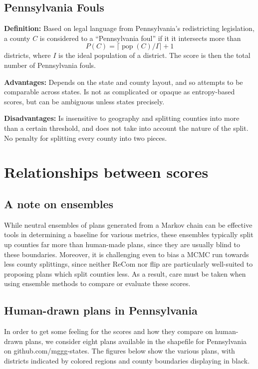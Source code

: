 \documentclass{mgggarticle}
\DeclareMathOperator{\pop}{pop}
\begin{document}
\subsection{Pennsylvania Fouls}
\textbf{Definition: } Based on legal language from Pennsylvania's redistricting legislation, a county $C$ is considered to a ``Pennsylvania foul'' if it it intersects more than 
$$
P(C) = \lceil \pop(C)/I \rceil+1 
$$
districts, where $I$ is the ideal population of a district. The score is then the total number of Pennsylvania fouls.

\textbf{Advantages: } Depends on the state and county layout, and so attempts to be comparable across states. Is not as complicated or opaque as entropy-based scores, but can be ambiguous unless states precisely.

\textbf{Disadvantages: } Is insensitive to geography and splitting counties into more than a certain threshold, and does not take into account the nature of the split. No penalty for splitting every county into two pieces.


\section{Relationships between scores}

\subsection{A note on ensembles}
While neutral ensembles of plans generated from a Markov chain can be effective tools in determining a baseline for various metrics, these ensembles typically split up counties far more than human-made plans, since they are usually blind to these boundaries. Moreover, it is challenging even to bias a MCMC run towards less county splittings, since neither ReCom nor flip are particularly well-suited to proposing plans which split counties less. As a result, care must be taken when using ensemble methods to compare or evaluate these scores.

\subsection{Human-drawn plans in Pennsylvania}
In order to get some feeling for the scores and how they compare on human-drawn plans, we consider eight plans available in the shapefile for Pennsylvania on github.com/mggg-states. The figures below show the various plans, with districts indicated by colored regions and county boundaries displaying in black.
\end{document}
